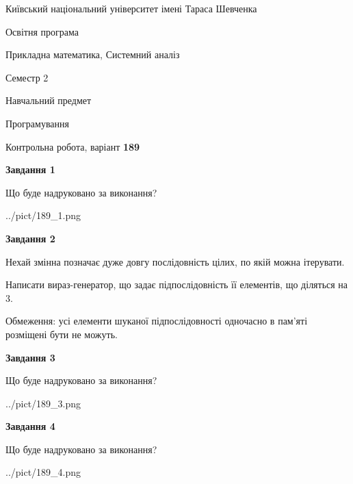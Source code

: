 \documentclass[12pt, ukrainian]{article}
\begin{document}
{{\begin {small}\par
{ \center  Київський національний університет імені Тараса Шевченка \par}
{\parbox {5 cm}{Освітня програма \hfill}{\parbox {8 cm}{Прикладна математика, Системний аналіз \hfill}}\parbox {5 cm}{\hfill Семестр 2}}\par
{\parbox {5 cm} {Навчальний предмет \hfill}\parbox {7 cm}{Програмування \hfill}\parbox {6cm}{\hfill}\par}\vspace{-7pt} \end{small}}{\center Контрольна робота, варіант  \No \textbf
{ 189 }\par}}
{
\begin {large}
{\begin {center}\textbf{Завдання 1}\end {center}}\par
Що буде надруковано за виконання?\par\par
\begin{center}
	{../pict/189_1.png}
\end{center}
\newpage

{\begin {center}\textbf{Завдання 2}\end {center}}\par
Нехай змінна  позначає дуже довгу послідовність цілих, по якій можна ітерувати.

Написати вираз-генератор, що задає підпослідовність її елементів, що діляться на 3.

Обмеження: усі елементи шуканої підпослідовності одночасно в пам'яті розміщені бути не можуть.\par
\newpage

{\begin {center}\textbf{Завдання 3}\end {center}}\par
Що буде надруковано за виконання?
\begin{center}
	{../pict/189_3.png}
\end{center}
\newpage

{\begin {center}\textbf{Завдання 4}\end {center}}\par
Що буде надруковано за виконання?\par
\begin{center}
	{../pict/189_4.png}
\end{center}
\newpage


\end{large}}
\end{document}
